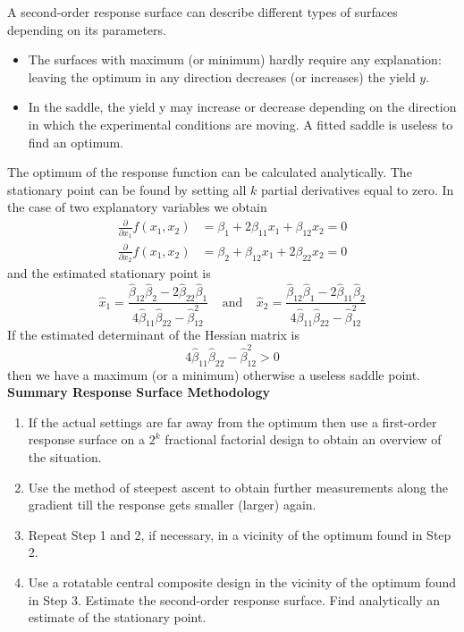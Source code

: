 A second-order response surface can describe different types of surfaces depending on its parameters.
\begin{itemize}
  \item The surfaces with maximum (or minimum) hardly require any explanation: leaving the optimum in any direction decreases (or increases) the yield $y$.
  \item In the saddle, the yield y may increase or decrease depending on the direction in which the experimental conditions are moving. A fitted saddle is useless to find an optimum.
\end{itemize}

The optimum of the response function can be calculated analytically. The stationary point can be found by setting all $k$ partial derivatives equal to zero.
In the case of two explanatory variables we obtain
\begin{equation}
  \begin{split}
    \frac{\partial}{\partial x_1}f(x_1, x_2) &= \beta_1 + 2\beta_{11} x_1 +  \beta_{12} x_2 = 0 \\
    \frac{\partial}{\partial x_2}f(x_1, x_2) &= \beta_2 +  \beta_{12} x_1 + 2\beta_{22} x_2 = 0
  \end{split}
\end{equation}
and the estimated stationary point is
\begin{equation}
  \hat{x}_1 = \frac{\hat{\beta}_{12} \hat{\beta}_{2} - 2\hat{\beta}_{22} \hat{\beta}_{1}}{4\hat{\beta}_{11} \hat{\beta}_{22} - \hat{\beta}_{12}^2}
  \;\;\;\;\text{and}\;\;\;\;
  \hat{x}_2 = \frac{\hat{\beta}_{12} \hat{\beta}_{1} - 2\hat{\beta}_{11} \hat{\beta}_{2}}{4\hat{\beta}_{11} \hat{\beta}_{22} - \hat{\beta}_{12}^2}
\end{equation}
If the estimated determinant of the Hessian matrix is
\begin{equation}
  4\hat{\beta}_{11} \hat{\beta}_{22} - \hat{\beta}_{12}^2 > 0
\end{equation}
then we have a maximum (or a minimum) otherwise a useless saddle point.\\

\textbf{Summary Response Surface Methodology}\\
\begin{enumerate}
  \item  If the actual settings are far away from the optimum then use a first-order response surface on a $2^k$ fractional factorial design to obtain an overview of the situation.
  \item  Use the method of steepest ascent to obtain further measurements along the gradient till the response gets smaller (larger) again.
  \item  Repeat Step 1 and 2, if necessary, in a vicinity of the optimum found in Step 2.
  \item  Use a rotatable central composite design in the vicinity of the optimum found in Step 3. Estimate the second-order response surface. Find analytically an estimate of the stationary point.
\end{enumerate}

